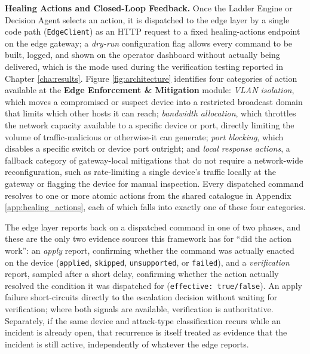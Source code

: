 \textbf{Healing Actions and Closed-Loop Feedback.} Once the Ladder Engine or Decision Agent selects an action, it is dispatched to the edge layer by a single code path (\texttt{EdgeClient}) as an HTTP request to a fixed healing-actions endpoint on the edge gateway; a \textit{dry-run} configuration flag allows every command to be built, logged, and shown on the operator dashboard without actually being delivered, which is the mode used during the verification testing reported in Chapter \ref{cha:results}. Figure \ref{fig:architecture} identifies four categories of action available at the \textbf{Edge Enforcement \& Mitigation} module: \textit{VLAN isolation}, which moves a compromised or suspect device into a restricted broadcast domain that limits which other hosts it can reach; \textit{bandwidth allocation}, which throttles the network capacity available to a specific device or port, directly limiting the volume of traffic-malicious or otherwise-it can generate; \textit{port blocking}, which disables a specific switch or device port outright; and \textit{local response actions}, a fallback category of gateway-local mitigations that do not require a network-wide reconfiguration, such as rate-limiting a single device's traffic locally at the gateway or flagging the device for manual inspection. Every dispatched command resolves to one or more atomic actions from the shared catalogue in Appendix \ref{app:healing_actions}, each of which falls into exactly one of these four categories.

The edge layer reports back on a dispatched command in one of two phases, and these are the only two evidence sources this framework has for ``did the action work'': an \textit{apply} report, confirming whether the command was actually enacted on the device (\texttt{applied}, \texttt{skipped}, \texttt{unsupported}, or \texttt{failed}), and a \textit{verification} report, sampled after a short delay, confirming whether the action actually resolved the condition it was dispatched for (\texttt{effective: true/false}). An apply failure short-circuits directly to the escalation decision without waiting for verification; where both signals are available, verification is authoritative. Separately, if the same device and attack-type classification recurs while an incident is already open, that recurrence is itself treated as evidence that the incident is still active, independently of whatever the edge reports.

